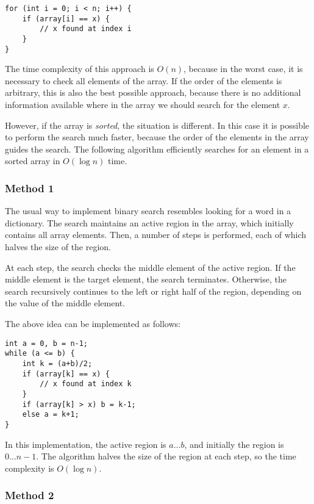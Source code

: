\begin{lstlisting}
for (int i = 0; i < n; i++) {
    if (array[i] == x) {
        // x found at index i
    }
}
\end{lstlisting}

The time complexity of this approach is $O(n)$,
because in the worst case, it is necessary to check
all elements of the array.
If the order of the elements is arbitrary,
this is also the best possible approach, because
there is no additional information available where
in the array we should search for the element $x$.

However, if the array is \emph{sorted},
the situation is different.
In this case it is possible to perform the
search much faster, because the order of the
elements in the array guides the search.
The following  algorithm
efficiently searches for an element in a sorted array
in $O(\log n)$ time.

\subsubsection{Method 1}

The usual way to implement binary search
resembles looking for a word in a dictionary.
The search maintains an active region in the array,
which initially contains all array elements.
Then, a number of steps is performed,
each of which halves the size of the region.

At each step, the search checks the middle element
of the active region.
If the middle element is the target element,
the search terminates.
Otherwise, the search recursively continues
to the left or right half of the region,
depending on the value of the middle element.

The above idea can be implemented as follows:
\begin{lstlisting}
int a = 0, b = n-1;
while (a <= b) {
    int k = (a+b)/2;
    if (array[k] == x) {
        // x found at index k
    }
    if (array[k] > x) b = k-1;
    else a = k+1;
}
\end{lstlisting}

In this implementation, the active region is $a \ldots b$,
and initially the region is $0 \ldots n-1$.
The algorithm halves the size of the region at each step,
so the time complexity is $O(\log n)$.

\subsubsection{Method 2}


